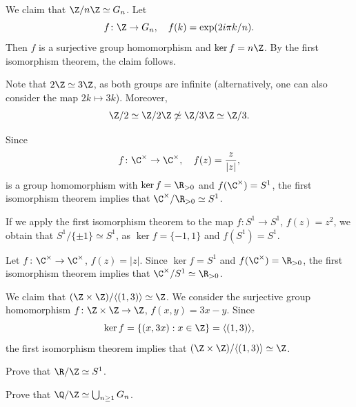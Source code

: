 \begin{example}
We claim that $\Z/n\Z\simeq G_n$. Let 
\[
f\colon\Z\to G_n,\quad
f(k)=\exp(2i\pi k/n).
\]
Then $f$ is a surjective group homomorphism and
$\ker f=n\Z$. By the first isomorphism theorem, the claim follows. 
\end{example}

\begin{example}
Note that $2\Z\simeq 3\Z$, as both groups are infinite (alternatively, one can also consider the map $2k\mapsto 3k$). Moreover, 
\[
\Z/2\simeq\Z/2\Z\not\simeq\Z/3\Z\simeq\Z/3.
\]
\end{example}

\begin{example}
Since 
\[
f\colon\C^\times\to\C^\times,
\quad
f(z)=\frac{z}{|z|},
\]
is a group homomorphism with $\ker f=\R_{>0}$ and
$f(\C^\times)=S^1$, the first isomorphism theorem 
implies that 
$\C^\times/\R_{>0}\simeq S^1$.
\end{example}

\begin{example}
If we apply the first isomorphism theorem to the
map $f\colon S^1\to S^1$, $f(z)=z^2$, we obtain that 
$S^1/\{\pm1\}\simeq S^1$, as 
$\ker f=\{-1,1\}$ and $f(S^1)=S^1$.
\end{example}

\begin{example}
Let $f\colon\C^\times\to\C^\times$, $f(z)=|z|$. Since $\ker f=S^1$ and $f(\C^\times)=\R_{>0}$, the first isomorphism theorem 
implies that $\C^\times/S^1\simeq\R_{>0}$.
\end{example}

\begin{example}
We claim that 
$(\Z\times\Z)/\langle (1,3)\rangle\simeq\Z$. We consider
the surjective group homomorphism 
$f\colon\Z\times\Z\to\Z$, $f(x,y)=3x-y$. Since 
\[
\ker f=\{(x,3x):x\in\Z\}=\langle (1,3)\rangle,
\]
the first isomorphism theorem implies that 
$(\Z\times\Z)/\langle (1,3)\rangle\simeq\Z$.
\end{example}


\begin{exercise}
Prove that $\R/\Z\simeq S^1$.
\end{exercise}



\begin{exercise}
Prove that $\Q/\Z\simeq\bigcup_{n\geq1}G_n$.
\end{exercise}

